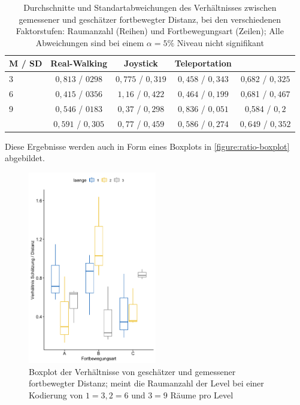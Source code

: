                     \begin{table}[!h] %
                        \renewcommand\arraystretch{1.2}
                        \centering
\begin{tabular}{l|ccc|c}
M / SD & Real-Walking  & Joystick     & Teleportation &               \\ \midrule
3  & $0,813$ / $0298$ & $0,775$ / $0,319$ & $0,458$ / $0,343$ & 0,682 / $0,325$ \\
6  & $0,415$ / $0356$ & $1,16$  / $0,422$ & $0,464$ / $0,199$ & 0,681 / $0,467$ \\
9  & $0,546$ / $0183$ & $0,37$  / $0,298$ & $0,836$ / $0,051$ & 0,584 / $0,2$   \\ \bottomrule
   & $0,591$ / $0,305$ & $0,77$ / $0,459$ & $0,586$ / $0,274$ & $0,649$ / $0,352$
\end{tabular}
                        \caption{Durchschnitte und Standartabweichungen des Verhältnisses zwischen gemessener und geschätzer fortbewegter Distanz, bei den verschiedenen Faktorstufen: Raumanzahl (Reihen) und Fortbewegungsart (Zeilen);  Alle Abweichungen sind bei einem $\alpha = 5\%$ Niveau nicht signifikant}\label{table:ratio_means}
                    \end{table}

                    Diese Ergebnisse werden auch in Form eines Boxplots in \autoref{figure:ratio-boxplot} abgebildet.

                    \begin{figure}[!h]
                        \centering
                        \includegraphics[width=0.5\textwidth]{plots/2wayboxplot.png}
                        \caption{Boxplot der Verhältnisse von geschätzer und gemessener fortbewegter Distanz;  meint die Raumanzahl der Level bei einer Kodierung von $1 = 3, 2 = 6$ und $3 = 9$ Räume pro Level}\label{figure:ratio-boxplot}
                    \end{figure}

